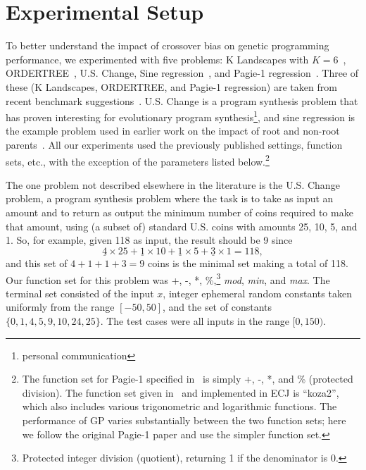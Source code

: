 \documentclass{sig-alternate}
\begin{document}
\section{Experimental Setup} \label{sec:Experiments}

To better understand the impact of crossover bias on genetic programming performance, we 
experimented with five problems: K Landscapes with $K=6$~\cite{vanneschi2011k}, 
ORDER\-TREE~\cite{hoang2006ordertree}, U.S. Change, Sine regression~\cite{poli08:fieldguide}, 
and Pagie-1 regression~\cite{pagie1997evolutionary}.
Three of these (K Landscapes, ORDERTREE, and Pagie-1 regression) are taken from recent benchmark 
suggestions~\cite{gp-benchmarks-2013}. U.S. Change is a program synthesis problem  that has proven 
interesting for evolutionary program synthesis\footnote{personal communication}, and sine regression 
is the example problem used in earlier work on the impact of root and non-root 
parents~\cite{McPheeDonatucciDramdahl:2014}. All our experiments used the previously published
settings, function sets, etc., with the exception of the parameters listed below.\footnote{The function 
set for Pagie-1 specified in~\cite{pagie1997evolutionary} is simply +, -, *, and \% (protected division). 
The function set given in~\cite{mcdermott2012genetic} and implemented in ECJ is ``koza2'', which 
also includes various trigonometric and logarithmic functions. The performance of GP varies 
substantially between the two function sets; here we follow the original Pagie-1 paper and use the 
simpler function set.}

The one problem not described elsewhere in the literature is the U.S. Change problem, a program 
synthesis problem where the task is to take as input an amount and to return as output the minimum 
number of coins required to make that amount, using (a subset of) standard U.S. coins with amounts 
25, 10, 5, and 1. So, for example, given 118 as input, the result should be 9 since 
\[
	\underline{4} \times 25 + \underline{1} \times 10 + \underline{1} \times 5 + \underline{3} \times 1 = 118,
\]
and this set of $4+1+1+3 = 9$ coins is the minimal set 
making a total of 118. Our function set for this problem was +, -, *, \%,\footnote{Protected integer 
division (quotient), returning 1 if the denominator is 0.} \emph{mod}, \emph{min}, and \emph{max}. 
The terminal set consisted of the input $x$, integer ephemeral random constants taken uniformly 
from the range $[-50, 50]$, and the set of constants $\{ 0, 1, 4, 5, 9, 10, 24, 25 \}$. The test cases 
were all inputs in the range $[0, 150)$.
\end{document}
